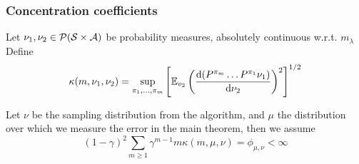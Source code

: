 \subsubsection{Concentration coefficients}

\begin{defn} \label{defn:ccoefs}
  Let $\nu_1, \nu_2 \in \mathcal{P}(\mathcal{S}\times \mathcal{A})$ be probability measures,
  absolutely continuous w.r.t. $m_{\lambda}$
  Define
  \[ \kappa(m, \nu_1, \nu_2) = \sup_{\pi_1, \dots, \pi_m}
    \left[ \mathbb{E}_{v_2} \left( \frac{\mathrm{d} (P^{\pi_m} \dots P^{\pi_1} \nu_1)}
  {\mathrm{d} \nu_2} \right)^2 \right]^{1/2} \]
\end{defn}

\begin{asm}\label{asm:A2}
  Let $\nu$ be the sampling distribution from the algorithm, and $\mu$ the distribution
  over which we measure the error in the main theorem, then we assume
  \[ (1 - \gamma)^2 \sum_{m\geq 1} \gamma^{m-1} m \kappa(m, \mu, \nu)
  = \phi_{\mu, \nu} < \infty \]
\end{asm}


